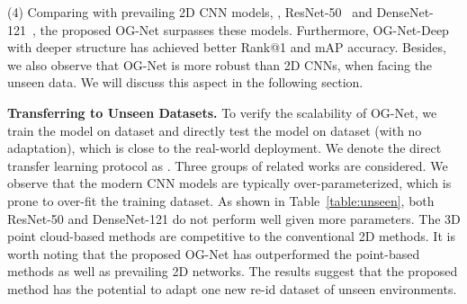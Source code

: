 (4) Comparing with prevailing 2D CNN models, \ie, ResNet-50~\cite{he2016deep} and DenseNet-121~\cite{Huang2017Densely}, the proposed OG-Net surpasses these models. Furthermore, OG-Net-Deep with deeper structure has achieved better Rank@1 and mAP accuracy. Besides, we also observe that OG-Net is more robust than 2D CNNs, when facing the unseen data. We will discuss this aspect in the following section.  



\textbf{Transferring to Unseen Datasets.} To verify the scalability of OG-Net, we train the model on dataset  and directly test the model on dataset  (with no adaptation), which is close to the real-world deployment. We denote the direct transfer learning protocol as . Three groups of related works are considered. We observe that the modern CNN models are typically over-parameterized, which is prone to over-fit the training dataset. As shown in Table~\ref{table:unseen}, both ResNet-50 and DenseNet-121 do not perform well given more parameters. The 3D point cloud-based methods are competitive to the conventional 2D methods. 
It is worth noting that the proposed OG-Net has outperformed the point-based methods as well as prevailing 2D networks. The results suggest that the proposed method has the potential to adapt one new re-id dataset of unseen environments. 

